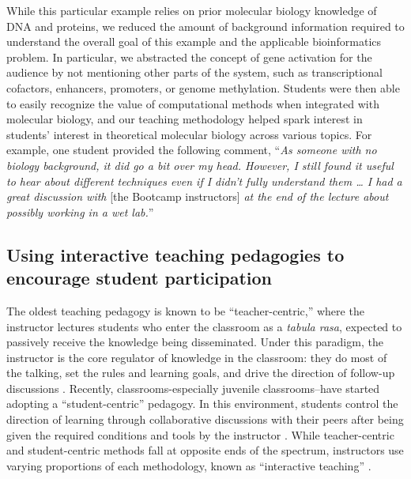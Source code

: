While this particular example relies on prior molecular biology knowledge of DNA and proteins, we reduced the amount of background information required to understand the overall goal of this example and the applicable bioinformatics problem. In particular, we abstracted the concept of gene activation for the audience by not mentioning other parts of the system, such as transcriptional cofactors, enhancers, promoters, or genome methylation. Students were then able to easily recognize the value of computational methods when integrated with molecular biology, and our teaching methodology helped spark interest in students' interest in theoretical molecular biology across various topics. For example, one student provided the following comment, “\textit{As someone with no biology background, it did go a bit over my head. However, I still found it useful to hear about different techniques even if I didn't fully understand them … I had a great discussion with} [the Bootcamp instructors] \textit{at the end of the lecture about possibly working in a wet lab.}” 

\subsection{Using interactive teaching pedagogies to encourage student participation} 

The oldest teaching pedagogy is known to be “teacher-centric,” where the instructor lectures students who enter the classroom as a \textit{tabula rasa}, expected to passively receive the knowledge being disseminated. Under this paradigm, the instructor is the core regulator of knowledge in the classroom: they do most of the talking, set the rules and learning goals, and drive the direction of follow-up discussions \cite{freire1970}. Recently, classrooms-especially juvenile classrooms--have started adopting a “student-centric” pedagogy. In this environment, students control the direction of learning through collaborative discussions with their peers after being given the required conditions and tools by the instructor \cite{estes2004,wright2011,brush2000}. While teacher-centric and student-centric methods fall at opposite ends of the spectrum, instructors use varying proportions of each methodology, known as “interactive teaching” \cite{senthamarai2018,kennewell2008}.

